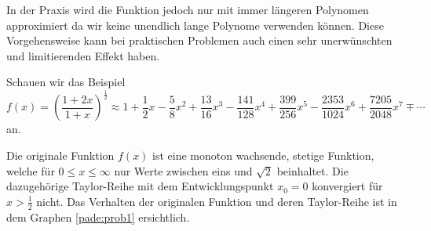 In der Praxis wird die Funktion jedoch nur mit immer längeren Polynomen approximiert da wir keine unendlich lange Polynome verwenden können.
Diese Vorgehensweise kann bei praktischen Problemen auch einen sehr unerwünschten und limitierenden Effekt haben. 

\begin{beispiel}
Schauen wir das Beispiel 
\begin{equation*}
f(x)
=
\left(\frac{1+2x}{1+x}\right)^{\frac{1}{2}}
\approx
1+\frac{1}{2}x - \frac{5}{8}x^2+\frac{13}{16}x^3 -\frac{141}{128}x^4 +\frac{399}{256}x^5 - \frac{2353}{1024}x^6 + \frac{7205}{2048}x^7 \mp \cdots
\end{equation*}
an. 

Die originale Funktion $f(x)$ ist eine monoton wachsende, stetige Funktion, welche für $0\leq x\leq\infty$ nur Werte zwischen eins und $\sqrt{2}$ beinhaltet.
Die dazugehörige Taylor-Reihe mit dem Entwicklungspunkt $x_0=0$ konvergiert für $x>\frac{1}{2}$ nicht. 
Das Verhalten der originalen Funktion und deren Taylor-Reihe ist in dem Graphen \ref{pade:prob1} ersichtlich. 


\end{beispiel}
